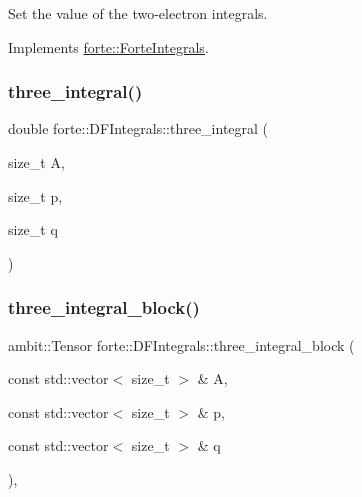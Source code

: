 Set the value of the two-\/electron integrals. 



Implements \mbox{\hyperlink{classforte_1_1_forte_integrals_aaccd56e90bbc3c423158efb154336b9c}{forte\+::\+Forte\+Integrals}}.

\mbox{\label{classforte_1_1_d_f_integrals_a3d33d2d8107f1066c08f62e62ba51c8a}} 
\subsubsection{\texorpdfstring{three\+\_\+integral()}{three\_integral()}}
{\footnotesize\ttfamily double forte\+::\+D\+F\+Integrals\+::three\+\_\+integral (\begin{DoxyParamCaption}\item[{size\+\_\+t}]{A,  }\item[{size\+\_\+t}]{p,  }\item[{size\+\_\+t}]{q }\end{DoxyParamCaption})}

\mbox{\label{classforte_1_1_d_f_integrals_a830361fd7e2efd8c8d22fd5abcacfad1}} 
\subsubsection{\texorpdfstring{three\+\_\+integral\+\_\+block()}{three\_integral\_block()}}
{\footnotesize\ttfamily ambit\+::\+Tensor forte\+::\+D\+F\+Integrals\+::three\+\_\+integral\+\_\+block (\begin{DoxyParamCaption}\item[{const std\+::vector$<$ size\+\_\+t $>$ \&}]{A,  }\item[{const std\+::vector$<$ size\+\_\+t $>$ \&}]{p,  }\item[{const std\+::vector$<$ size\+\_\+t $>$ \&}]{q }\end{DoxyParamCaption})\hspace{0.3cm}{\ttfamily [override]}, {\ttfamily [virtual]}}



